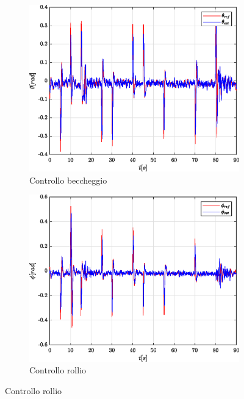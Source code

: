 \begin{figure}
	\centering
	\begin{subfigure}{0.45\textwidth}
		\centering
		\includegraphics[width=1\textwidth]{Simulazioni/Figure/SMC/SNAKE/AttitudeControlPitch}
		\caption{Controllo beccheggio}
		\label{fig:SNAKEbecSMC}
	\end{subfigure}
	\hfill
	\begin{subfigure}{0.45\textwidth}
		\centering
		\includegraphics[width=1\textwidth]{Simulazioni/Figure/SMC/SNAKE/AttitudeControlRoll}
		\caption{Controllo rollio}
		\label{fig:SNAKErolSMC}
	\end{subfigure}

\end{figure}
